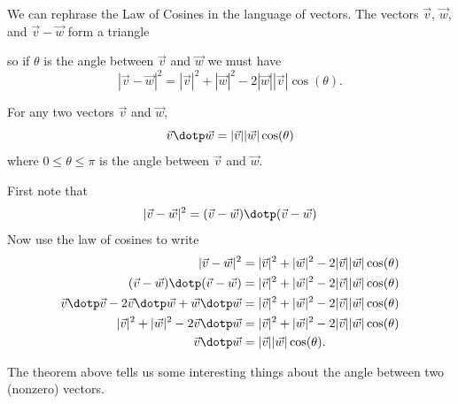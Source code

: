 \documentclass{ximera}
\begin{document}
We can rephrase the Law of Cosines in the language of vectors.  The
vectors $\vec{v}$, $\vec{w}$, and $\vec{v} - \vec{w}$ form a triangle
\begin{image}
\end{image}
so if $\theta$ is the angle between $\vec{v}$ and $\vec{w}$ we must
have
\[
|\vec{v} - \vec{w}|^2=|\vec{v}|^2+|\vec{w}|^2-2|\vec{w}||\vec{v}|\cos(\theta).
\]



\begin{theorem}
  For any two vectors $\vec{v}$ and $\vec{w}$,
  \[
  \vec{v} \dotp \vec{w} = |\vec{v}||\vec{w}|\cos(\theta)
  \]
  where $0\le \theta\le\pi$ is the angle between $\vec{v}$ and
  $\vec{w}$.
  \begin{explanation}
    First note that
    \[
    |\vec{v} - \vec{w}|^2 =  (\vec{v} - \vec{w})\dotp(\vec{v} - \vec{w})
    \]
    Now use the law of cosines to write
    \begin{align*}
      |\vec{v} - \vec{w}|^2&=|\vec{v}|^2+|\vec{w}|^2-2|\vec{v}||\vec{w}|\cos(\theta)\\
      (\vec{v} - \vec{w})\dotp(\vec{v} - \vec{w}) &=|\vec{v}|^2+|\vec{w}|^2-2|\vec{v}||\vec{w}|\cos(\theta)\\
      \vec{v}\dotp\vec{v} -2\vec{v}\dotp\vec{w}+\vec{w}\dotp\vec{w}&=|\vec{v}|^2+|\vec{w}|^2-2|\vec{v}||\vec{w}|\cos(\theta)\\
      |\vec{v}|^2+|\vec{w}|^2 -2\vec{v}\dotp\vec{w} &=|\vec{v}|^2+|\vec{w}|^2-2|\vec{v}||\vec{w}|\cos(\theta)\\
      \vec{v} \dotp \vec{w} &= |\vec{v}||\vec{w}|\cos(\theta).
    \end{align*}
  \end{explanation}
\end{theorem}

The theorem above tells us some interesting things about the angle 
between two (nonzero) vectors.
\end{document}
